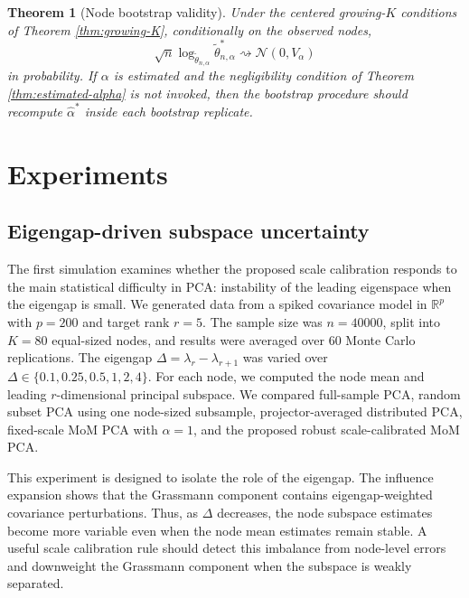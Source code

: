 \documentclass[11pt]{article}
\newtheorem{theorem}{Theorem}
\newcommand{\R}{\mathbb R}
\newcommand{\dto}{\rightsquigarrow}
\newcommand{\Normal}{\mathcal N}
\begin{document}
\begin{theorem}[Node bootstrap validity]\label{thm:bootstrap}
Under the centered growing-\(K\) conditions of Theorem \ref{thm:growing-K}, conditionally on the observed nodes,
\begin{equation}\label{eq:bootstrap-validity}
    \sqrt n\log_{\widetilde\theta_{n,\alpha}}
    \widetilde\theta_{n,\alpha}^*
    \dto \Normal(0,V_\alpha)
\end{equation}
 in probability.  If \(\alpha\) is estimated and the negligibility condition of Theorem \ref{thm:estimated-alpha} is not invoked, then the bootstrap procedure should recompute \(\widehat\alpha^*\) inside each bootstrap replicate.
\end{theorem}


\section{Experiments}\label{sec-experiment}
\subsection{Eigengap-driven subspace uncertainty}
\label{subsec:sim-eigengap}

The first simulation examines whether the proposed scale calibration responds to the main statistical difficulty in PCA: instability of the leading eigenspace when the eigengap is small.  We generated data from a spiked covariance model in \(\R^p\) with \(p=200\) and target rank \(r=5\).  The sample size was \(n=40000\), split into \(K=80\) equal-sized nodes, and results were averaged over 60 Monte Carlo replications.  The eigengap $\Delta=\lambda_r-\lambda_{r+1}$ was varied over
$\Delta\in\{0.1,0.25,0.5,1,2,4\}.$ For each node, we computed the node mean and leading \(r\)-dimensional principal subspace.  We compared full-sample PCA, random subset PCA using one node-sized subsample, projector-averaged distributed PCA, fixed-scale MoM PCA with \(\alpha=1\), and the proposed robust scale-calibrated MoM PCA.

This experiment is designed to isolate the role of the eigengap.  The influence expansion shows that the Grassmann component contains eigengap-weighted covariance perturbations.  Thus, as \(\Delta\) decreases, the node subspace estimates become more variable even when the node mean estimates remain stable.  A useful scale calibration rule should detect this imbalance from node-level errors and downweight the Grassmann component when the subspace is weakly separated.
\end{document}
